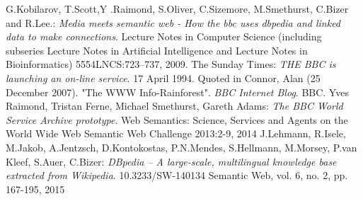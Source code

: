 \documentclass{llncs}
\begin{document}
%

%
%
\begin{thebibliography}{5}
%
  G.Kobilarov, T.Scott,Y .Raimond, S.Oliver, C.Sizemore, M.Smethurst, C.Bizer and R.Lee.:
  \textit{Media meets semantic web - How the bbc uses dbpedia and linked data to make connections}.
  Lecture Notes in Computer Science (including subseries Lecture Notes in Artiﬁcial Intelligence and Lecture Notes in Bioinformatics)
  5554LNCS:723–737, 2009.
%
  The Sunday Times:
  \textit{THE BBC is launching an on-line service}. 17 April 1994.
  Quoted in Connor, Alan (25 December 2007). "The WWW Info-Rainforest". \textit{BBC Internet Blog}. BBC.
%
  Yves Raimond, Tristan Ferne, Michael Smethurst, Gareth Adams:
  \textit{The BBC World Service Archive prototype}.
  Web Semantics: Science, Services and Agents on the World Wide Web
  Semantic Web Challenge 2013:2-9, 2014
%
  J.Lehmann, R.Isele, M.Jakob, A.Jentzsch, D.Kontokostas, P.N.Mendes, S.Hellmann, M.Morsey, P.van Kleef, S.Auer, C.Bizer:
  \textit{DBpedia – A large-scale, multilingual knowledge base extracted from Wikipedia}.
  10.3233/SW-140134
  Semantic Web, vol. 6, no. 2, pp. 167-195, 2015
%
\end{thebibliography}
\end{document}
